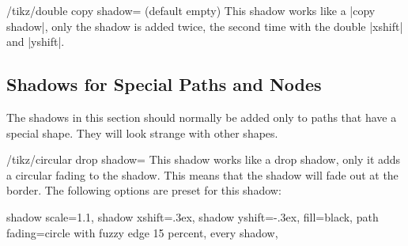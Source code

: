 \begin{key}{/tikz/double copy shadow= (default \normalfont empty)}
    This shadow works like a |copy shadow|, only the shadow is added twice, the
    second time with the double |xshift| and |yshift|.
\begin{codeexample}[preamble={\usetikzlibrary{shadows,shapes.symbols}}]
\end{codeexample}
\end{key}


\subsection{Shadows for Special Paths and Nodes}

The shadows in this section should normally be added only to paths that have a
special shape. They will look strange with other shapes.

\begin{key}{/tikz/circular drop shadow=}
    This shadow works like a drop shadow, only it adds a circular fading to the
    shadow. This means that the shadow will fade out at the border. The
    following options are preset for this shadow:
\begin{codeexample}
  shadow scale=1.1, shadow xshift=.3ex, shadow yshift=-.3ex,
  fill=black, path fading={circle with fuzzy edge 15 percent},
  every shadow,
\end{codeexample}

\begin{codeexample}[preamble={\usetikzlibrary{shadows}}]
\end{codeexample}
\end{key}

